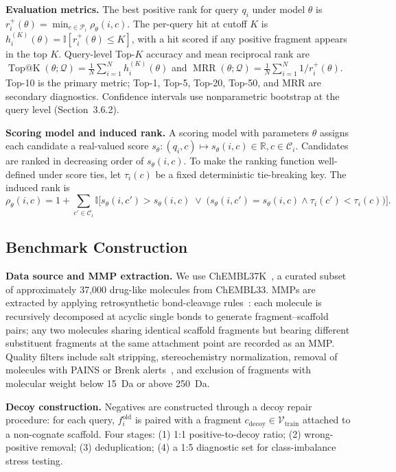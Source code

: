 \documentclass[12pt,letterpaper]{article}
\begin{document}
\textbf{Evaluation metrics.}
The best positive rank for query $q_i$ under model $\theta$ is $r_i^+(\theta)=\min_{c\in\mathcal{P}_i}\rho_\theta(i,c)$. The per-query hit at cutoff $K$ is $h_i^{(K)}(\theta)=\mathbb{I}[r_i^+(\theta)\le K]$, with a hit scored if any positive fragment appears in the top $K$. Query-level Top-$K$ accuracy and mean reciprocal rank are $\operatorname{Top@K}(\theta;\mathcal{Q}) = \frac{1}{N}\sum_{i=1}^{N}h_i^{(K)}(\theta)$ and $\operatorname{MRR}(\theta;\mathcal{Q}) = \frac{1}{N}\sum_{i=1}^{N}1/r_i^+(\theta)$. Top-10 is the primary metric; Top-1, Top-5, Top-20, Top-50, and MRR are secondary diagnostics. Confidence intervals use nonparametric bootstrap at the query level (Section~3.6.2).

\textbf{Scoring model and induced rank.}
A scoring model with parameters $\theta$ assigns each candidate a real-valued score $s_{\theta} : (q_i,c) \mapsto s_{\theta}(i,c)\in\mathbb{R}, c\in\mathcal{C}_i$. Candidates are ranked in decreasing order of $s_{\theta}(i,c)$. To make the ranking function well-defined under score ties, let $\tau_i(c)$ be a fixed deterministic tie-breaking key. The induced rank is
%
\begin{equation}
\rho_{\theta}(i,c) = 1 + \sum_{c'\in\mathcal{C}_i} \mathbb{I}\!\bigl[ s_{\theta}(i,c')>s_{\theta}(i,c) \;\lor\; \bigl(s_{\theta}(i,c')=s_{\theta}(i,c)\land \tau_i(c')<\tau_i(c)\bigr) \bigr].
\end{equation}

\subsection{Benchmark Construction}

\textbf{Data source and MMP extraction.}
We use ChEMBL37K~\cite{zdrazil2024chembl}, a curated subset of approximately 37,000 drug-like molecules from ChEMBL33. MMPs are extracted by applying retrosynthetic bond-cleavage rules~\cite{hussain2010computationally,griffen2011matched}: each molecule is recursively decomposed at acyclic single bonds to generate fragment--scaffold pairs; any two molecules sharing identical scaffold fragments but bearing different substituent fragments at the same attachment point are recorded as an MMP. Quality filters include salt stripping, stereochemistry normalization, removal of molecules with PAINS or Brenk alerts~\cite{baell2010new,brenk2008lessons}, and exclusion of fragments with molecular weight below 15~Da or above 250~Da.

\textbf{Decoy construction.}
Negatives are constructed through a decoy repair procedure: for each query, $f_i^{\mathrm{old}}$ is paired with a fragment $c_{\mathrm{decoy}} \in \mathcal{V}_{\mathrm{train}}$ attached to a non-cognate scaffold. Four stages: (1) 1:1 positive-to-decoy ratio; (2) wrong-positive removal; (3) deduplication; (4) a 1:5 diagnostic set for class-imbalance stress testing.
\end{document}
